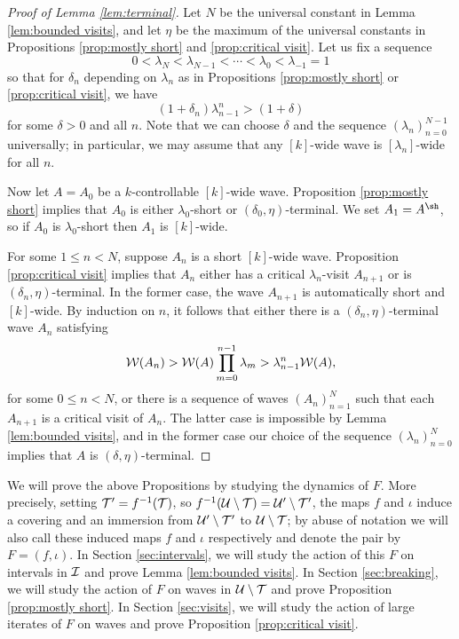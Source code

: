 \documentclass[12pt]{amsart}
\begin{document}
\begin{proof}[Proof of Lemma \ref{lem:terminal}]
    Let $N$ be the universal constant in Lemma \ref{lem:bounded visits}, and let $\eta$ be the maximum of the universal constants in Propositions \ref{prop:mostly short} and \ref{prop:critical visit}.
    Let us fix a sequence $$0< \lambda_N< \lambda_{N-1}< \cdots <\lambda_0 < \lambda_{-1} = 1$$
    so that for $\delta_n$ depending on $\lambda_n$ as in Propositions \ref{prop:mostly short} or \ref{prop:critical visit}, we have
    $$(1+\delta_n)\lambda_{n-1}^n> (1+\delta)$$
    for some $\delta>0$ and all $n$. Note that we can choose $\delta$ and the sequence $(\lambda_n)_{n=0}^{N-1}$ universally; in particular, we may assume that any $[k]$-wide wave is $[\lambda_n]$-wide for all $n$.

    Now let $A=A_0$ be a $k$-controllable $[k]$-wide wave. Proposition \ref{prop:mostly short} implies that  $A_0$ is either $\lambda_0$-short or $(\delta_0, \eta)$-terminal.
	We set $A_1= A^\sh$, so if $A_0$ is $\lambda_0$-short then $A_1$ is $[k]$-wide.
	
    For some $1\leq n <  N$, suppose $A_n$ is a short $[k]$-wide wave. Proposition \ref{prop:critical visit} implies that $A_n$ either has a critical $\lambda_{n}$-visit $A_{n+1}$ or is $(\delta_n, \eta)$-terminal. In the former case, the wave $A_{n+1}$ is automatically short and $[k]$-wide.
	By induction on $n$, it follows that either there is a  $(\delta_n, \eta)$-terminal wave $A_n$ satisfying
	$$\mathcal W(A_n)> \mathcal W(A)\prod_{m=0}^{n-1}\lambda_m>  \lambda_{n-1}^n\mathcal W(A),$$
	for some $0\leq n < N$, 
	or there is a sequence of waves $(A_n)_{n=1}^{N}$ such that each $A_{n+1}$ is a critical visit of $A_n$. 
	The latter case is impossible by Lemma \ref{lem:bounded visits}, and in the former case our choice of the sequence $(\lambda_n)_{n=0}^N$ implies that $A$ is $(\delta, \eta)$-terminal.
\end{proof}

We will prove the above Propositions by studying the dynamics of $F$. More precisely, setting $\mathcal T' = f^{-1}(\mathcal T)$, so $f^{-1}(\mathcal U\setminus \mathcal T)= \mathcal U' \setminus \mathcal T'$, the maps $f$ and $\iota$ induce a covering and an immersion from $\mathcal U'\setminus \mathcal T'$ to $\mathcal U\setminus \mathcal T$; by abuse of notation we will also call these induced maps $f$ and $\iota$ respectively and denote the pair by $F = (f, \iota)$.
In Section \ref{sec:intervals}, we will study the action of this $F$ on intervals in $\mathcal I$ and prove Lemma \ref{lem:bounded visits}. 
In Section \ref{sec:breaking}, we will study the action of $F$ on waves in $\mathcal U\setminus \mathcal T$ and prove Proposition \ref{prop:mostly short}.
In Section \ref{sec:visits}, we will study the action of large iterates of $F$ on waves and prove Proposition \ref{prop:critical visit}.
\end{document}
